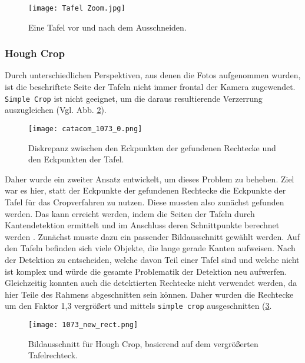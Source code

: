 \begin{figure}[h!]
\centering
\texttt{[image: Tafel Zoom.jpg]}
\caption{Eine Tafel vor und nach dem Ausschneiden.}
\label{fig:tafelcrop}
\end{figure}

\subsubsection{Hough Crop}

Durch unterschiedlichen Perspektiven, aus denen die Fotos aufgenommen wurden, ist die beschriftete Seite der Tafeln nicht immer frontal der Kamera zugewendet. \verb|Simple Crop| ist nicht geeignet, um die daraus resultierende Verzerrung auszugleichen (Vgl. Abb. \ref{fig:parallelogramm}). 

\begin{figure}[h!]
\centering
\texttt{[image: catacom\_1073\_0.png]}
\caption{Diskrepanz zwischen den Eckpunkten der gefundenen Rechtecke und den Eckpunkten der Tafel.}
\label{fig:parallelogramm}
\end{figure}

Daher wurde ein zweiter Ansatz entwickelt, um dieses Problem zu beheben. Ziel war es hier, statt der Eckpunkte der gefundenen Rechtecke die Eckpunkte der Tafel für das Cropverfahren zu nutzen. Diese mussten also zunächst gefunden werden. Das kann erreicht werden, indem die Seiten der Tafeln durch Kantendetektion ermittelt und im Anschluss deren Schnittpunkte berechnet werden \cite{qixiangye}.
Zunächst musste dazu ein passender Bildausschnitt gewählt werden. Auf den Tafeln befinden sich viele Objekte, die lange gerade Kanten aufweisen. Nach der Detektion zu entscheiden, welche davon Teil einer Tafel sind und welche nicht ist komplex und würde die gesamte Problematik der Detektion neu aufwerfen. Gleichzeitig konnten auch die detektierten Rechtecke nicht verwendet werden, da hier Teile des Rahmens abgeschnitten sein können. Daher wurden die Rechtecke um den Faktor 1,3 vergrößert und mittels \verb|simple crop| ausgeschnitten (\ref{fig:tafelrechteck}.

\begin{figure}[h!]
\centering
\texttt{[image: 1073\_new\_rect.png]}
\caption{Bildausschnitt für Hough Crop, basierend auf dem vergrößerten Tafelrechteck.}
\label{fig:tafelrechteck}
\end{figure}

